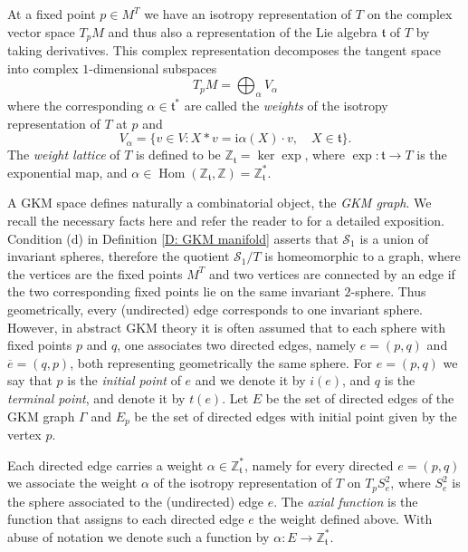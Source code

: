 \documentclass[12pt,a4paper]{amsart}
\theoremstyle{plain}
\theoremstyle{definition}
\begin{document}
At a fixed point $p \in M^{T}$ we have an isotropy representation of $T$ on the complex
vector space $T_{p}M$ and thus also a representation of the Lie algebra $\mathfrak t$ of
$T$ by taking derivatives. This complex representation decomposes the tangent space into
complex $1$-dimensional subspaces
\begin{equation}\label{V alpha}
	T_{p}M = \bigoplus_{\alpha} V_{\alpha}
\end{equation}
where the corresponding $\alpha \in \mathfrak t^{\ast}$ are called the \emph{weights} of the isotropy representation of $T$ at $p$
and
\[
	V_{\alpha} = \{ v \in V : X * v = \mathrm{i}\alpha(X) \cdot v, \quad X \in \mathfrak
	t\}.
\]
The \emph{weight lattice} of $T$ is defined to be
$\mathbb{Z}_{\mathfrak t} = \ker \exp$, where $\exp\colon \mathfrak{t}\to T$ is the exponential map, and $\alpha \in
\operatorname{Hom}(\mathbb{Z}_{\mathfrak t}, \mathbb{Z}) = \mathbb{Z}_{\mathfrak
t}^{\ast}$. 


A GKM space defines naturally a combinatorial object, the \emph{GKM graph}.
We recall the necessary facts here and refer the reader to
\cite{MR1823050} for a detailed exposition. Condition (d) in Definition \ref{D: GKM
manifold} asserts that $\mathcal{S}_1$ is a union of invariant spheres, therefore
the quotient $\mathcal{S}_1/T$ is homeomorphic to a graph, where the vertices are the fixed points
$M^{T}$
 and two vertices are connected by an edge if the two corresponding fixed points lie on the same
invariant $2$-sphere. Thus
geometrically, every (undirected) edge corresponds to one invariant sphere. However, in abstract GKM theory 
it is often assumed that to each sphere with fixed points $p$ and $q$, one associates 
two directed edges, namely $e=(p,q)$ and $\overline{e}=(q,p)$, both representing geometrically the same sphere. For $e=(p,q)$ we say that 
$p$ is the \emph{initial point} of $e$ and we denote it by $i(e)$, and $q$ is the \emph{terminal point}, and denote it by $t(e)$. 
Let $E$ be the set of directed edges of the GKM graph $\Gamma$ and 
$E_p$ be the set of directed edges with initial point given by the vertex $p$.

Each directed edge carries a weight $\alpha\in \mathbb{Z}_{\mathfrak
t}^{\ast}$, namely for every directed $e=(p,q)$ we associate the weight $\alpha$ of the isotropy representation of
$T$ on $T_pS_e^2$, where $S_e^2$ is the sphere associated to the (undirected) edge $e$.
The \emph{axial function} is the function
that assigns to each directed edge $e$ the weight defined above. With abuse of notation we denote such a function
by $\alpha\colon E \to \mathbb{Z}_{\mathfrak
t}^{\ast}$. 
\end{document}
